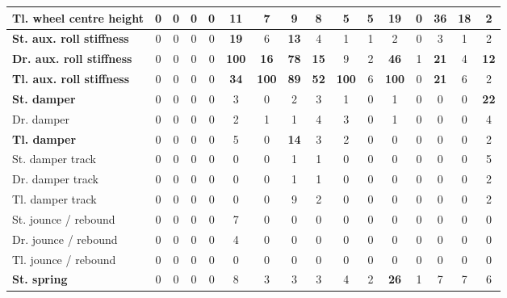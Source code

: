 \begin{table}[H]
\begin{tabular}{|l|c|c|c|c|c|c|c|c|c|c|c|c|c|c|c|}
    \hline
    \textcolor[rgb]{0.000, 0.620, 0.451}{\textbf{Tl. wheel centre height}} & 0 & 0 & 0 & 0 & \textbf{11} & 7 & 9 & 8 & 5 & 5 & \textbf{19} & 0 & \textcolor[rgb]{0.000, 0.620, 0.451}{\textbf{36}} & \textbf{18} & 2 \\
    \hline
    \textbf{St. aux. roll stiffness} & 0 & 0 & 0 & 0 & \textbf{19} & 6 & \textbf{13} & 4 & 1 & 1 & 2 & 0 & 3 & 1 & 2 \\
    \hline
    \textcolor[rgb]{0.851, 0.373, 0.008}{\textbf{Dr. aux. roll stiffness}} & 0 & 0 & 0 & 0 & \textcolor[rgb]{0.835, 0.369, 0.000}{\textbf{100}} & \textbf{16} & \textcolor[rgb]{0.000, 0.447, 0.698}{\textbf{78}} & \textbf{15} & 9 & 2 & \textcolor[rgb]{0.000, 0.620, 0.451}{\textbf{46}} & 1 & \textbf{21} & 4 & \textbf{12} \\
    \hline
    \textcolor[rgb]{0.851, 0.373, 0.008}{\textbf{Tl. aux. roll stiffness}} & 0 & 0 & 0 & 0 & \textcolor[rgb]{0.000, 0.620, 0.451}{\textbf{34}} & \textcolor[rgb]{0.835, 0.369, 0.000}{\textbf{100}} & \textcolor[rgb]{0.000, 0.447, 0.698}{\textbf{89}} & \textcolor[rgb]{0.000, 0.447, 0.698}{\textbf{52}} & \textcolor[rgb]{0.835, 0.369, 0.000}{\textbf{100}} & 6 & \textcolor[rgb]{0.835, 0.369, 0.000}{\textbf{100}} & 0 & \textbf{21} & 6 & 2 \\
    \hline
    \textbf{St. damper} & 0 & 0 & 0 & 0 & 3 & 0 & 2 & 3 & 1 & 0 & 1 & 0 & 0 & 0 & \textbf{22} \\
    \hline
    Dr. damper & 0 & 0 & 0 & 0 & 2 & 1 & 1 & 4 & 3 & 0 & 1 & 0 & 0 & 0 & 4 \\
    \hline
    \textbf{Tl. damper} & 0 & 0 & 0 & 0 & 5 & 0 & \textbf{14} & 3 & 2 & 0 & 0 & 0 & 0 & 0 & 2 \\
    \hline
    St. damper track & 0 & 0 & 0 & 0 & 0 & 0 & 1 & 1 & 0 & 0 & 0 & 0 & 0 & 0 & 5 \\
    \hline
    Dr. damper track & 0 & 0 & 0 & 0 & 0 & 0 & 1 & 1 & 0 & 0 & 0 & 0 & 0 & 0 & 2 \\
    \hline
    Tl. damper track & 0 & 0 & 0 & 0 & 0 & 0 & 9 & 2 & 0 & 0 & 0 & 0 & 0 & 0 & 2 \\
    \hline
    St. jounce / rebound & 0 & 0 & 0 & 0 & 7 & 0 & 0 & 0 & 0 & 0 & 0 & 0 & 0 & 0 & 0 \\
    \hline
    Dr. jounce / rebound & 0 & 0 & 0 & 0 & 4 & 0 & 0 & 0 & 0 & 0 & 0 & 0 & 0 & 0 & 0 \\
    \hline
    Tl. jounce / rebound & 0 & 0 & 0 & 0 & 0 & 0 & 0 & 0 & 0 & 0 & 0 & 0 & 0 & 0 & 0 \\
    \hline
    \textcolor[rgb]{0.000, 0.620, 0.451}{\textbf{St. spring}} & 0 & 0 & 0 & 0 & 8 & 3 & 3 & 3 & 4 & 2 & \textcolor[rgb]{0.000, 0.620, 0.451}{\textbf{26}} & 1 & 7 & 7 & 6 \\

\end{tabular}
\end{table}
